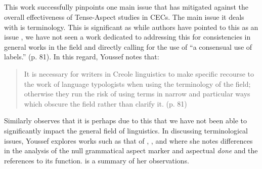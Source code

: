 \subsection{\citet{Youssef2003}}\label{sec:2.1.9}

This work successfully pinpoints one main issue that has mitigated
against the overall effectiveness of Tense-Aspect studies in CECs.
The main issue it deals with is terminology.  This is significant as
while authors have pointed to this as an issue \citep{Winford1993,Winford2001},
we have not seen a work dedicated to addressing this for
consistencies in general works in the field and directly calling for
the use of “a consensual use of labels.” (p. 81).  In this regard,
Youssef notes that:

\begin{quote}
It is necessary for writers in Creole linguistics to make specific
recourse to the work of language typologists when using the
terminology of the field; otherwise they run the risk of using terms
in narrow and particular ways which obscure the field rather than
clarify it. (p. 81)\end{quote}

Similarly \citet{Winford1993,Winford1997,Winford2001} observes that it
is perhaps due to this that we have not been able to significantly
impact the general field of linguistics.  In discussing terminological
issues, Youssef explores works such as that of \citet{Bickerton1975},
\citet{Holm1988}, \citet{Solomon1993} and \citet{Winford1993} where
she notes differences in the analysis of the null grammatical aspect
marker and aspectual \textit{done} and the references to its function.
 is a summary of her observations.

